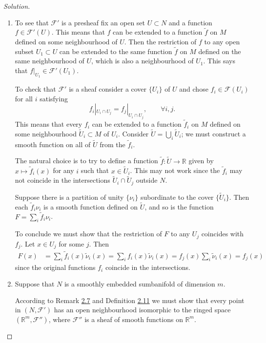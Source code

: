 \begin{proof}[Solution]\leavevmode
\begin{enumerate}[label=(\alph*)]
\item To see that $\mathcal{F}'$ is a presheaf fix an open set $U\subset N$ and a function $f \in \mathcal{F}'(U)$. This means that $f$ can be extended to a function $\tilde{f}$ on $M$ defined on some neighbourhood of $U$. Then the restriction of $f $ to any open subset  $U_1 \subset U$ can be extended to the same function \(\tilde{f}\) on $M$ defined on the same neighbourhood of $U$, which is also a neighbourhood of $U_1$. This says that $f|_{U_1}\in\mathcal{F}'(U_1)$.

	To check that $\mathcal{F}'$ is a sheaf consider a cover $ \{ U_i\}$ of $U$ and chose $f_i \in \mathcal{F}(U_i)$ for all $i$ satisfying
	\[f_i|_{U_i\cap U_j}=f_j|_{U_i \cap U_j},\qquad \forall i,j.\]
	This means that every $f_i$ can be extended to a function $\tilde{f}_i$ on $M$ defined on some neighbourhood $\tilde{U}_i \subset M$ of $U_i$. Consider $\tilde{U}=\bigcup_{i} \tilde{U}_i$; we must construct a smooth function on all of \(\tilde{U}\) from the \(\tilde{f}_i\).
	
	The natural choice is to try to define a function $\tilde{f}:\tilde{U}\to \mathbb{R}$ given by $x\mapsto \tilde{f}_i(x)$ for any $i$ such that $x \in \tilde{U}_i$. This may not work since the \(\tilde{f}_i\) may not coincide in the intersections \(\tilde{U}_i\cap \tilde{U}_j\) outside $N$.

	{\color{2}Suppose there is a partition of unity} \(\{\nu_i\}\) subordinate to the cover \(\{\tilde{U}_i\}\). Then each \(\tilde{f}_i\nu_i\) is a smooth function defined on \(\tilde{U}\), and so is the function \(F=\sum_i \tilde{f}_i\nu_i\).

	To conclude we must show that the restriction of \(F\) to any \(U_j\) coincides with \(f_j\). Let \(x \in U_j\) for some $j$. Then
	\begin{align*}
	F(x)&=\sum_i\tilde{f}_i(x)\tilde{\nu}_i(x)=\sum_if_i(x)\tilde{\nu}_i(x)=f_j(x)\sum_i\tilde{\nu}_i(x)=f_j(x)
	\end{align*}
since the original functions \(f_i\) coincide in the intersections.
	\item Suppose that $N$ is a smoothly embedded sumbanifold of dimension $m$.

According to Remark \hyperref[rk:2.7]{2.7} and Definition \hyperref[def:2.11]{2.11} we must show that every point in \((N,\mathcal{F}')\) has an open neighbourhood isomorphic to the ringed space \((\mathbb{R}^m,\mathcal{F}'')\), where \(\mathcal{F}''\) is a sheaf of smooth functions on \(\mathbb{R}^m\).


\end{enumerate}
\end{proof}
